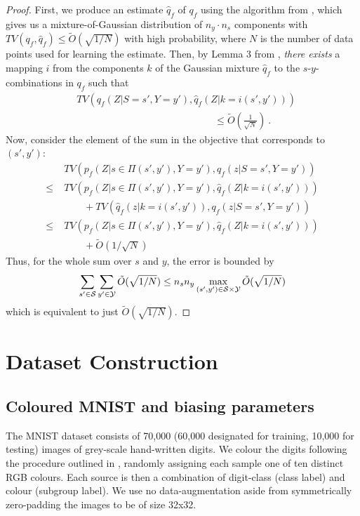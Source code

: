 \begin{proof}
First, we produce an estimate \(\hat{q}_f\) of \(q_f\) using the algorithm from
\citet{ashtiani2020near}, which gives us a mixture-of-Gaussian distribution of \(n_y\cdot n_s\)
components with \(TV(q_f, \hat{q}_f)\leq \tilde{O}(\sqrt{1/N})\) with high probability, where \(N\)
is the number of data points used for learning the estimate. Then, by Lemma 3 from
\citet{SohDunAngGuetal20}, \emph{there exists} a mapping \(i\) from the components \(k\) of the
Gaussian mixture \(\hat{q}_f\) to the \(s\)-\(y\)-combinations in \(q_f\) such that
%
\begin{align}
&TV(q_f(Z|S=s',Y=y'),\hat{q}_f(Z|k=i(s',y'))) \\
&\quad\quad\quad\quad\quad\quad\quad\quad\quad\quad\quad\quad\quad\quad\leq
\tilde{O}\left(\frac{1}{\sqrt{N}}\right)~. \nonumber
\end{align}
%
Now, consider the element of the sum in the objective that corresponds
to \((s',y')\):
%
\begin{align}
&TV(p_f(Z|s\in \Pi(s',y'),Y=y'), q_f(z|S=s',Y=y'))\nonumber\\
\leq \;&TV(p_f(Z|s\in \Pi(s',y'),Y=y'), \hat{q}_f(Z|k=i(s',y')))\nonumber\\
&\quad\quad+TV(\hat{q}_f(z|k=i(s',y')), q_f(z|S=s',Y=y'))\nonumber\\
\leq \;&TV(p_f(Z|s\in \Pi(s',y'),Y=y'), \hat{q}_f(Z|k=i(s',y'))) \nonumber\\
&\quad\quad+\tilde{O}(1/\sqrt{N})
\end{align}
%
Thus, for the whole sum over \(s\) and \(y\), the error is bounded by
\begin{align}
\sum\limits_{s'\in{\mathcal{S}}}\sum\limits_{y^\prime\in{\mathcal{Y}}}\tilde{O}(\sqrt{1/N})
\leq n_sn_y \max\limits_{(s',y')\in{\mathcal{S}}\times{\mathcal{Y}}}\tilde{O}(\sqrt{1/N})
\end{align}
which is equivalent to just \(\tilde{O}(\sqrt{1/N})\).
\end{proof}
%
\section{Dataset Construction}\label{sec:dataset-construction}
%
\subsection{Coloured MNIST and biasing parameters}
%
The MNIST dataset \citep{lecun1998gradient} consists of 70,000 (60,000 designated for training,
10,000 for testing) images of grey-scale hand-written digits. We colour the digits following the
procedure outlined in \citet{KehBarThoQua20}, randomly assigning each sample one of ten distinct RGB
colours. Each source is then a combination of digit-class (class label) and colour (subgroup label).
We use no data-augmentation aside from symmetrically zero-padding the images to be of size 32x32.

